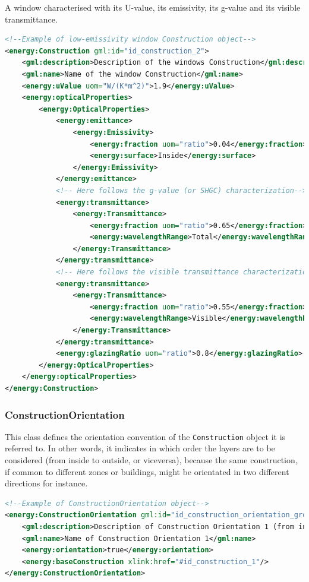 \documentclass[a4paper,12pt]{article}
\begin{document}
A window characterised with its U-value, its emissivity, its g-value and
its visible transmittance.

\begin{lstlisting}[language=XML]
<!--Example of low-emissivity window Construction object-->
<energy:Construction gml:id="id_construction_2">
    <gml:description>Description of the windows Construction</gml:description>
    <gml:name>Name of the window Construction</gml:name>
    <energy:uValue uom="W/(K*m^2)">1.9</energy:uValue>
    <energy:opticalProperties>
        <energy:OpticalProperties>
            <energy:emittance>
                <energy:Emissivity>
                    <energy:fraction uom="ratio">0.04</energy:fraction>
                    <energy:surface>Inside</energy:surface>
                </energy:Emissivity>
            </energy:emittance>
            <!-- Here follows the g-value (or SHGC) characterization-->
            <energy:transmittance>
                <energy:Transmittance>
                    <energy:fraction uom="ratio">0.65</energy:fraction>
                    <energy:wavelengthRange>Total</energy:wavelengthRange>
                </energy:Transmittance>
            </energy:transmittance>
            <!-- Here follows the visible transmittance characterization-->
            <energy:transmittance>
                <energy:Transmittance>
                    <energy:fraction uom="ratio">0.55</energy:fraction>
                    <energy:wavelengthRange>Visible</energy:wavelengthRange>
                </energy:Transmittance>
            </energy:transmittance>
            <energy:glazingRatio uom="ratio">0.8</energy:glazingRatio>
        </energy:OpticalProperties>
    </energy:opticalProperties>
</energy:Construction>
\end{lstlisting}

\subsubsection{ConstructionOrientation}\label{constructionorientation}

This class defines the orientation convention of the
\lstinline!Construction! object it is referred to. In other words, it
indicates in which order the layers are to be considered (from inside to
outside, or viceversa), because the same construction, if common to
different zones or buildings, might be orientated in two different
directions for instance.

\begin{lstlisting}[language=XML]
<!--Example of ConstructionOrientation object-->
<energy:ConstructionOrientation gml:id="id_construction_orientation_ground_1">
    <gml:description>Description of Construction Orientation 1 (from inside to outside)</gml:description>
    <gml:name>Name of Construction Orientation 1</gml:name>
    <energy:orientation>true</energy:orientation>
    <energy:baseConstruction xlink:href="#id_construction_1"/>
</energy:ConstructionOrientation>
\end{lstlisting}
\end{document}
